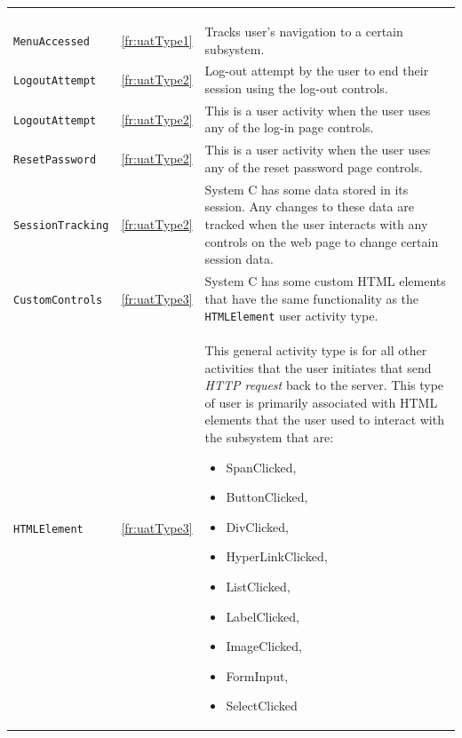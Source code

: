 \begin{xltabular}{\textwidth}{llX}
	\caption[System A activity types]{\textit{System A activity types}}\label{tbl:ch3_systemCActivityTypes}\\
	\toprule
	 &  &  \\
	\midrule
	\endfirsthead

	\caption[]{\continueCaption} \\
	\toprule
	 &  &  \\
	\midrule
	\endhead

	\midrule
	 \\ 
	\endfoot
	\endlastfoot

	\texttt{MenuAccessed} & \ref{fr:uatType1} & \RaggedRight Tracks user's navigation to a certain subsystem. \\ 
	\texttt{LogoutAttempt} & \ref{fr:uatType2} & \RaggedRight Log-out attempt by the user to end their session using the log-out controls. \\ 
	\texttt{LogoutAttempt} & \ref{fr:uatType2} & \RaggedRight This is a user activity when the user uses any of the log-in page controls. \\
	\texttt{ResetPassword} & \ref{fr:uatType2} & \RaggedRight This is a user activity when the user uses any of the reset password page controls. \\
	\texttt{SessionTracking} & \ref{fr:uatType2} & \RaggedRight System C has some data stored in its session. Any changes to these data are tracked when the user interacts with any controls on the web page to change certain session data. \\
	\texttt{CustomControls} & \ref{fr:uatType3} & \RaggedRight System C has some custom HTML elements that have the same functionality as the \texttt{HTMLElement} user activity type. \\ 
	\texttt{HTMLElement} & \ref{fr:uatType3} & \RaggedRight This general activity type is for all other activities that the user initiates that send \textit{HTTP request} back to the server. This type of user is primarily associated with HTML elements that the user used to interact with the subsystem that are: \begin{itemize}
		\item SpanClicked,
		\item ButtonClicked, 
		\item DivClicked, 
		\item HyperLinkClicked,
		\item ListClicked, 
		\item LabelClicked, 
		\item ImageClicked, 
		\item FormInput, 
		\item SelectClicked
	\end{itemize} \\
	\bottomrule
\end{xltabular}

